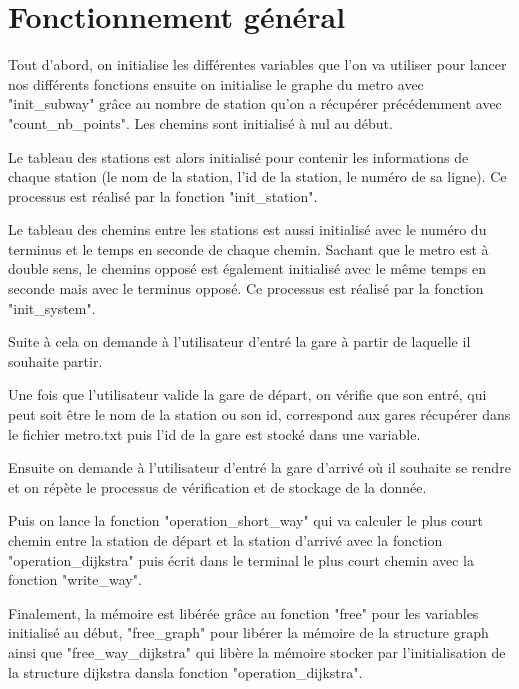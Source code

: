 \documentclass[a4]{article}
\begin{document}
\section{Fonctionnement général}
Tout d'abord, on initialise les différentes variables que l'on va utiliser pour lancer nos différents fonctions ensuite on initialise le graphe du metro avec "init\_subway" grâce au nombre de station qu'on a récupérer précédemment avec "count\_nb\_points". Les chemins sont initialisé à nul au début.\newline

Le tableau des stations est alors initialisé pour contenir les informations de chaque station (le nom de la station, l'id de la station, le numéro de sa ligne). Ce processus est réalisé par la fonction "init\_station".\newline

Le tableau des chemins entre les stations est aussi initialisé avec le numéro du terminus et le temps en seconde de chaque chemin. Sachant que le metro est à double sens, le chemins opposé est également initialisé avec le même temps en seconde mais avec le terminus opposé. Ce processus est réalisé par la fonction "init\_system".\newline

Suite à cela on demande à l'utilisateur d'entré la gare à partir de laquelle il souhaite partir.\newline

Une fois que l'utilisateur valide la gare de départ, on vérifie que son entré, qui peut soit être le nom de la station ou son id, correspond aux gares récupérer dans le fichier metro.txt puis l'id de la gare est stocké dans une variable.\newline

Ensuite on demande à l'utilisateur d'entré la gare d'arrivé où il souhaite se rendre et on répète le processus de vérification et de stockage de la donnée.\newline

Puis on lance la fonction "operation\_short\_way" qui va calculer le plus court chemin entre la station de départ et la station d'arrivé avec la fonction "operation\_dijkstra" puis écrit dans le terminal le plus court chemin avec la fonction "write\_way".\newline

Finalement, la mémoire est libérée grâce au fonction "free" pour les variables initialisé au début, "free\_graph" pour libérer la mémoire de la structure graph ainsi que "free\_way\_dijkstra" qui libère la mémoire stocker par l'initialisation de la structure dijkstra dansla fonction "operation\_dijkstra".\newline
\end{document}
